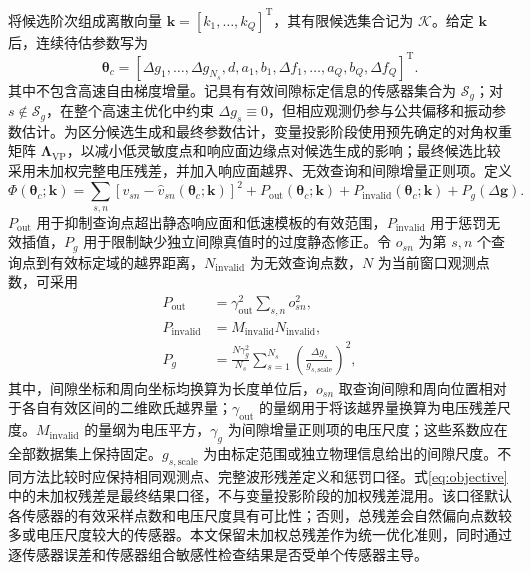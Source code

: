 \documentclass[UTF8,12pt,a4paper]{ctexart}
\begin{document}
将候选阶次组成离散向量 $\bm k=[k_1,\ldots,k_Q]^{\mathrm T}$，其有限候选集合记为 $\mathcal K$。给定 $\bm k$ 后，连续待估参数写为
\begin{equation}
\bm\theta_c=
\left[
\Delta g_1,\ldots,\Delta g_{N_s},d,
a_1,b_1,\Delta f_1,\ldots,
a_Q,b_Q,\Delta f_Q
\right]^{\mathrm T}.
\label{eq:theta}
\end{equation}
其中不包含高速自由梯度增量。记具有有效间隙标定信息的传感器集合为 $\mathcal S_g$；对 $s\notin\mathcal S_g$，在整个高速主优化中约束 $\Delta g_s\equiv0$，但相应观测仍参与公共偏移和振动参数估计。为区分候选生成和最终参数估计，变量投影阶段使用预先确定的对角权重矩阵 $\bm\Lambda_{\mathrm{VP}}$，以减小低灵敏度点和响应面边缘点对候选生成的影响；最终候选比较采用未加权完整电压残差，并加入响应面越界、无效查询和间隙增量正则项。定义
\begin{equation}
\Phi(\bm\theta_c;\bm k)=
\sum_{s,n}
\left[v_{sn}-\widehat v_{sn}(\bm\theta_c;\bm k)\right]^2
+P_{\mathrm{out}}(\bm\theta_c;\bm k)
+P_{\mathrm{invalid}}(\bm\theta_c;\bm k)
+P_g(\Delta\bm g).
\label{eq:objective}
\end{equation}
$P_{\mathrm{out}}$ 用于抑制查询点超出静态响应面和低速模板的有效范围，$P_{\mathrm{invalid}}$ 用于惩罚无效插值，$P_g$ 用于限制缺少独立间隙真值时的过度静态修正。令 $o_{sn}$ 为第 $s,n$ 个查询点到有效标定域的越界距离，$N_{\mathrm{invalid}}$ 为无效查询点数，$N$ 为当前窗口观测点数，可采用
\begin{equation}
\begin{aligned}
P_{\mathrm{out}}&=\gamma_{\mathrm{out}}^2\sum_{s,n}o_{sn}^2,\\
P_{\mathrm{invalid}}&=M_{\mathrm{invalid}}N_{\mathrm{invalid}},\\
P_g&=
\frac{N\gamma_g^2}{N_s}
\sum_{s=1}^{N_s}
\left(\frac{\Delta g_s}{g_{s,\mathrm{scale}}}\right)^2,
\end{aligned}
\label{eq:penalties}
\end{equation}
其中，间隙坐标和周向坐标均换算为长度单位后，$o_{sn}$ 取查询间隙和周向位置相对于各自有效区间的二维欧氏越界量；$\gamma_{\mathrm{out}}$ 的量纲用于将该越界量换算为电压残差尺度。$M_{\mathrm{invalid}}$ 的量纲为电压平方，$\gamma_g$ 为间隙增量正则项的电压尺度；这些系数应在全部数据集上保持固定。$g_{s,\mathrm{scale}}$ 为由标定范围或独立物理信息给出的间隙尺度。不同方法比较时应保持相同观测点、完整波形残差定义和惩罚口径。式\eqref{eq:objective}中的未加权残差是最终结果口径，不与变量投影阶段的加权残差混用。该口径默认各传感器的有效采样点数和电压尺度具有可比性；否则，总残差会自然偏向点数较多或电压尺度较大的传感器。本文保留未加权总残差作为统一优化准则，同时通过逐传感器误差和传感器组合敏感性检查结果是否受单个传感器主导。
\end{document}
